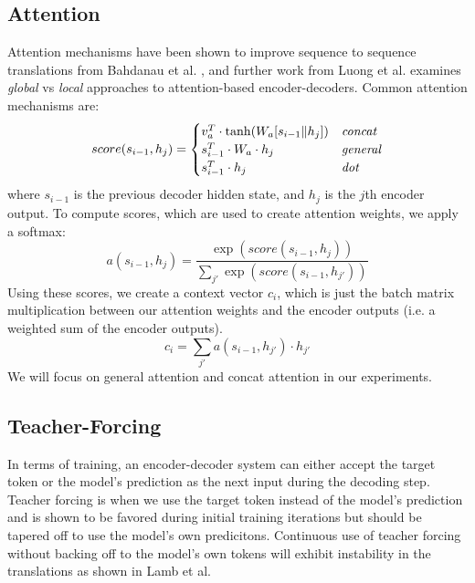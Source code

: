 \documentclass[twoside,twocolumn]{article}
\begin{document}
\subsection{Attention}
Attention mechanisms have been shown to improve sequence to sequence
translations from Bahdanau et al. \cite{bahdanau2014neural}, and further work
from Luong et al. \cite{luong2015effective} examines \emph{global} vs
\emph{local} approaches
to attention-based encoder-decoders. Common attention mechanisms are:
\begin{equation}
    score(s_{i-1}, h_j) =
    \begin{cases}
        v_a^T \cdot \tanh (W_a [s_{i-1} \| h_j]) & \text{\emph{concat}} \\
        s_{i-1}^T \cdot W_a \cdot h_j & \text{\emph{general}} \\
        s_{i-1}^T \cdot h_j & \text{\emph{dot}} \\
    \end{cases}
\end{equation}
where $s_{i-1}$ is the previous decoder hidden state, and $h_j$ is the $j$th
encoder output.
To compute scores, which are used to create attention weights, we apply a
softmax:
\begin{equation}
  a(s_{i-1}, h_j) = \frac{\exp(score(s_{i-1}, h_j))}{\sum_{j'}\exp(score(s_{i-1}, h_{j'}))}
\end{equation}
Using these scores, we create a context vector $c_i$, which is just the batch
matrix multiplication between our attention weights and the encoder outputs
(i.e. a weighted sum of the encoder outputs).
\begin{equation}
  c_i = \sum_{j'} a(s_{i-1}, h_{j'}) \cdot h_{j'}
\end{equation}
We will focus on general attention and concat attention in our
experiments.
\subsection{Teacher-Forcing}
In terms of training, an encoder-decoder system can either accept the target
token or the model's prediction as the next input during the decoding step.
Teacher forcing is when we use the target token instead of the model's
prediction and is
shown to be favored during initial training iterations but should be tapered
off to use the model's own predicitons. Continuous use of teacher forcing
without backing off to the model's own tokens will exhibit instability
in the translations as shown in Lamb et al. \cite{lamb2016professor}
\end{document}
